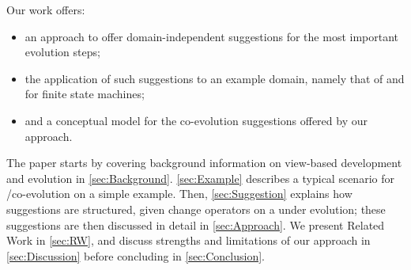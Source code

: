 Our work offers:
\begin{itemize}
    \item an approach to offer domain-independent suggestions for the most important \metamodel evolution steps;
    \item the application of such suggestions to an example domain, namely that of \metamodels and \viewtypes for finite state machines;
    \item and a conceptual model for the \viewtype co-evolution suggestions offered by our approach.
\end{itemize}

The paper starts by covering background information on view-based development and
\metamodel evolution in \cref{sec:Background}. \cref{sec:Example} describes
a typical scenario for \metamodel/\viewtype co-evolution on a simple example. Then, \cref{sec:Suggestion} explains how \viewtype suggestions are structured, given
change operators on a \metamodel under evolution; these suggestions are then discussed in detail in \cref{sec:Approach}. We present Related Work in \cref{sec:RW}, and discuss strengths and limitations of our approach in \cref{sec:Discussion} before concluding in \cref{sec:Conclusion}.